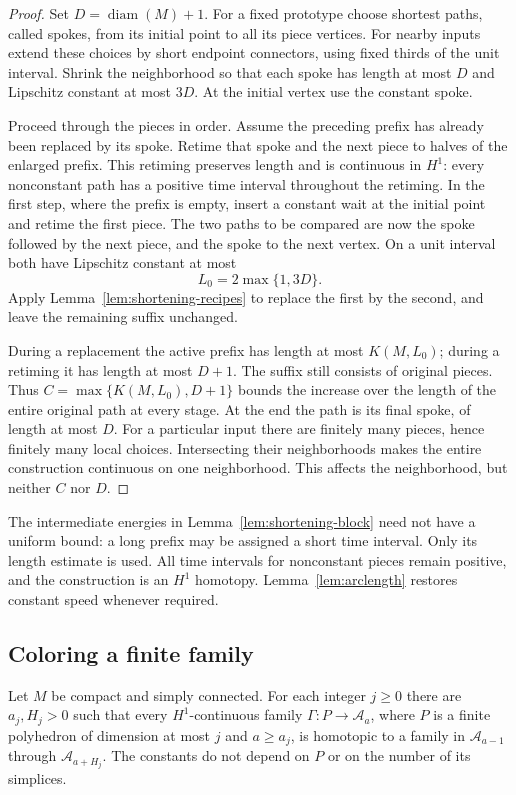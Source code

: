 \begin{proof}
Set $D=\operatorname{diam}(M)+1$.  For a fixed prototype choose shortest
paths, called spokes, from its initial point to all its piece vertices.
For nearby inputs extend these choices by short endpoint connectors,
using fixed thirds of the unit interval.  Shrink the neighborhood so that
each spoke has length at most $D$ and Lipschitz constant at most $3D$.
At the initial vertex use the constant spoke.

Proceed through the pieces in order.  Assume the preceding prefix has
already been replaced by its spoke.  Retime that spoke and the next
piece to halves of the enlarged prefix.  This retiming preserves length
and is continuous in $H^1$: every nonconstant path has a positive time
interval throughout the retiming.  In the first step, where the prefix
is empty, insert a constant wait at the initial point and retime the
first piece.  The two paths to be compared are now the spoke followed by
the next piece, and the spoke to the next vertex.  On a unit interval
both have Lipschitz constant at most
\[
 L_0=2\max\{1,3D\}.
\]
Apply Lemma~\ref{lem:shortening-recipes} to replace the first by the
second, and leave the remaining suffix unchanged.

During a replacement the active prefix has length at most $K(M,L_0)$;
during a retiming it has length at most $D+1$.  The suffix still consists
of original pieces.  Thus $C=\max\{K(M,L_0),D+1\}$ bounds the increase
over the length of the entire original path at every stage.  At the end
the path is its final spoke, of length at most $D$.
For a particular input there are finitely many pieces, hence finitely
many local choices.  Intersecting their neighborhoods makes the entire
construction continuous on one neighborhood.  This affects the
neighborhood, but neither $C$ nor $D$.
\end{proof}

The intermediate energies in Lemma~\ref{lem:shortening-block} need not
have a uniform bound: a long prefix may be assigned a short time interval.
Only its length estimate is used.  All time intervals for nonconstant
pieces remain positive, and the construction is an $H^1$ homotopy.
Lemma~\ref{lem:arclength} restores constant speed whenever required.

\subsection{Coloring a finite family}

\begin{lemma}
\label{lem:shortening-family}
Let $M$ be compact and simply connected.
For each integer $j\ge0$ there are $a_j,H_j>0$ such that every
$H^1$-continuous family $\Gamma:P\to\mathcal A_a$, where $P$ is a finite
polyhedron of dimension at most $j$ and $a\ge a_j$, is homotopic to a
family in $\mathcal A_{a-1}$ through $\mathcal A_{a+H_j}$.
The constants do not depend on $P$ or on the number of its simplices.
\end{lemma}

